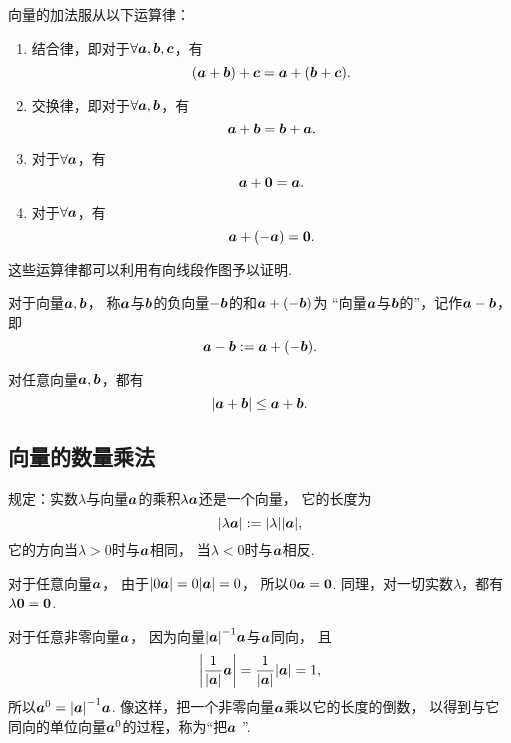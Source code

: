 向量的加法服从以下运算律：
\begin{enumerate}
	\item 结合律，即对于\(\forall \boldsymbol{a},\boldsymbol{b},\boldsymbol{c}\)，有\[
		(\boldsymbol{a}+\boldsymbol{b})+\boldsymbol{c}
		= \boldsymbol{a}+(\boldsymbol{b}+\boldsymbol{c}).
	\]

	\item 交换律，即对于\(\forall \boldsymbol{a},\boldsymbol{b}\)，有\[
		\boldsymbol{a}+\boldsymbol{b} = \boldsymbol{b}+\boldsymbol{a}.
	\]

	\item 对于\(\forall \boldsymbol{a}\)，有\[
		\boldsymbol{a}+\boldsymbol{0}=\boldsymbol{a}.
	\]

	\item 对于\(\forall \boldsymbol{a}\)，有\[
		\boldsymbol{a}+(-\boldsymbol{a})=\boldsymbol{0}.
	\]
\end{enumerate}
这些运算律都可以利用有向线段作图予以证明.

\begin{definition}
对于向量\(\boldsymbol{a},\boldsymbol{b}\)，
称\(\boldsymbol{a}\)与\(\boldsymbol{b}\)的负向量\(-\boldsymbol{b}\)的和\(\boldsymbol{a}+(-\boldsymbol{b})\)为
“向量\(\boldsymbol{a}\)与\(\boldsymbol{b}\)的”，记作\(\boldsymbol{a}-\boldsymbol{b}\)，即\[
	\boldsymbol{a}-\boldsymbol{b}
	:=
	\boldsymbol{a}+(-\boldsymbol{b}).
\]
\end{definition}

\begin{theorem}
对任意向量\(\boldsymbol{a},\boldsymbol{b}\)，都有\[
	\abs{\boldsymbol{a}+\boldsymbol{b}} \leq \boldsymbol{a} + \boldsymbol{b}.
\]
\end{theorem}

\subsection{向量的数量乘法}
\begin{definition}
规定：实数\(\lambda\)与向量\(\boldsymbol{a}\)的乘积\(\lambda \boldsymbol{a}\)还是一个向量，
它的长度为\[
\abs{\lambda\boldsymbol{a}}
:=
\abs{\lambda} \abs{\boldsymbol{a}},
\]
它的方向当\(\lambda>0\)时与\(\boldsymbol{a}\)相同，
当\(\lambda<0\)时与\(\boldsymbol{a}\)相反.
\end{definition}

对于任意向量\(\boldsymbol{a}\)，
由于\(\abs{0 \boldsymbol{a}} = 0 \abs{\boldsymbol{a}} = 0\)，
所以\(0 \boldsymbol{a} = \boldsymbol{0}\).
同理，对一切实数\(\lambda\)，都有\(\lambda \boldsymbol{0} = \boldsymbol{0}\).

对于任意非零向量\(\boldsymbol{a}\)，
因为向量\(\abs{\boldsymbol{a}}^{-1} \boldsymbol{a}\)与\(\boldsymbol{a}\)同向，
且\[
	\abs{\frac{1}{\abs{\boldsymbol{a}}} \boldsymbol{a}}
	= \frac{1}{\abs{\boldsymbol{a}}} \abs{\boldsymbol{a}} = 1,
\]
所以\(\boldsymbol{a}^0 = \abs{\boldsymbol{a}}^{-1} \boldsymbol{a}\).
像这样，把一个非零向量\(\boldsymbol{a}\)乘以它的长度的倒数，
以得到与它同向的单位向量\(\boldsymbol{a}^0\)的过程，称为“把\(\boldsymbol{a}\) ”.

